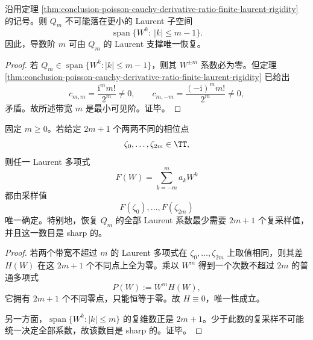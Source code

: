 \begin{corollary}\label{cor:conclusion-poisson-cauchy-minimal-laurent-order-identifiability}
沿用定理 \ref{thm:conclusion-poisson-cauchy-derivative-ratio-finite-laurent-rigidity} 的记号。则 \(Q_m\) 不可能落在更小的 Laurent 子空间
\[
\operatorname{span}\{W^k:\ |k|\le m-1\}.
\]
因此，导数阶 \(m\) 可由 \(Q_m\) 的 Laurent 支撑唯一恢复。
\end{corollary}
\begin{proof}
若 \(Q_m\in \operatorname{span}\{W^k:|k|\le m-1\}\)，则其 \(W^{\pm m}\) 系数必为零。但定理 \ref{thm:conclusion-poisson-cauchy-derivative-ratio-finite-laurent-rigidity} 已给出
\[
c_{m,m}=\frac{\mathrm{i}^m m!}{2^m}\neq 0,
\qquad
c_{m,-m}=\frac{(-\mathrm{i})^m m!}{2^m}\neq 0,
\]
矛盾。故所述带宽 \(m\) 是最小可见阶。证毕。
\end{proof}

\begin{theorem}\label{thm:conclusion-finite-laurent-certificate-sharp-sampling}
固定 \(m\ge 0\)。若给定 \(2m+1\) 个两两不同的相位点
\[
\zeta_0,\dots,\zeta_{2m}\in\TT,
\]
则任一 Laurent 多项式
\[
F(W)=\sum_{k=-m}^{m}a_kW^k
\]
都由采样值
\[
F(\zeta_0),\dots,F(\zeta_{2m})
\]
唯一确定。特别地，恢复 \(Q_m\) 的全部 Laurent 系数最少需要 \(2m+1\) 个复采样值，并且这一数目是 sharp 的。
\end{theorem}
\begin{proof}
若两个带宽不超过 \(m\) 的 Laurent 多项式在 \(\zeta_0,\dots,\zeta_{2m}\) 上取值相同，则其差 \(H(W)\) 在这 \(2m+1\) 个不同点上全为零。乘以 \(W^m\) 得到一个次数不超过 \(2m\) 的普通多项式
\[
P(W):=W^mH(W),
\]
它拥有 \(2m+1\) 个不同零点，只能恒等于零。故 \(H\equiv 0\)，唯一性成立。

另一方面，\(\operatorname{span}\{W^k:|k|\le m\}\) 的复维数正是 \(2m+1\)。少于此数的复采样不可能统一决定全部系数，故该数目是 sharp 的。证毕。
\end{proof}

